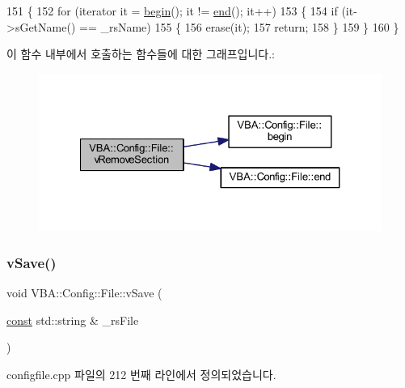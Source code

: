 \begin{DoxyCode}
151 \{
152   \textcolor{keywordflow}{for} (iterator it = \mbox{\hyperlink{class_v_b_a_1_1_config_1_1_file_a4dd88e6aa71829ce332139028225efcf}{begin}}(); it != \mbox{\hyperlink{class_v_b_a_1_1_config_1_1_file_a809724e386bf59c8726c33e822890c70}{end}}(); it++)
153   \{
154     \textcolor{keywordflow}{if} (it->sGetName() == \_rsName)
155     \{
156       erase(it);
157       \textcolor{keywordflow}{return};
158     \}
159   \}
160 \}
\end{DoxyCode}
이 함수 내부에서 호출하는 함수들에 대한 그래프입니다.\+:
\nopagebreak
\begin{figure}[H]
\begin{center}
\leavevmode
\includegraphics[width=327pt]{class_v_b_a_1_1_config_1_1_file_a4b9de49a799dc1e4de38710669127710_cgraph}
\end{center}
\end{figure}
\mbox{\label{class_v_b_a_1_1_config_1_1_file_a95ce8b60e20b58e730d9987843cba5a4}} 
\subsubsection{\texorpdfstring{v\+Save()}{vSave()}}
{\footnotesize\ttfamily void V\+B\+A\+::\+Config\+::\+File\+::v\+Save (\begin{DoxyParamCaption}\item[{\mbox{\hyperlink{getopt1_8c_a2c212835823e3c54a8ab6d95c652660e}{const}} std\+::string \&}]{\+\_\+rs\+File }\end{DoxyParamCaption})}



configfile.\+cpp 파일의 212 번째 라인에서 정의되었습니다.


